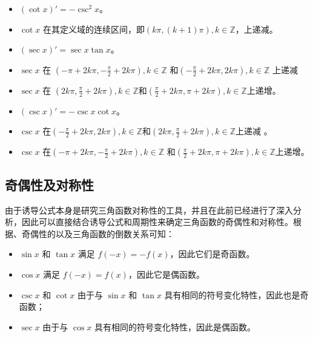 \begin{itemize}
\item $(\cot x)' = -\csc^2 x$。
\item $\cot x$ 在其定义域的连续区间，即$(k\pi, (k+1)\pi), k \in \mathbb{Z}$，上递减。
\item $(\sec x)' = \sec x \tan x$。
\item $\sec x$ 在 $\displaystyle\left(-\pi + 2k\pi, -\frac{\pi}{2} +2k\pi\right), k \in \mathbb{Z}$ 和$\displaystyle\left(-\frac{\pi}{2} + 2k\pi, 2k\pi\right), k \in \mathbb{Z}$ 上递减
\item $\sec x$ 在 $\displaystyle\left(2k\pi,\frac{\pi}{2} + 2k\pi\right), k \in \mathbb{Z}$和$\displaystyle\left(\frac{\pi}{2}  + 2k\pi, \pi+2k\pi\right), k \in \mathbb{Z}$上递增。
\item $(\csc x)' = -\csc x \cot x$。
\item $\csc x$ 在$\displaystyle\left(-\frac{\pi}{2} + 2k\pi, 2k\pi\right), k \in \mathbb{Z}$和$\displaystyle\left(2k\pi,\frac{\pi}{2} + 2k\pi\right), k \in \mathbb{Z}$上递减 。
\item $\csc x$ 在$\displaystyle\left(-\pi + 2k\pi, -\frac{\pi}{2} +2k\pi\right), k \in \mathbb{Z}$ 和$\displaystyle\left(\frac{\pi}{2}  + 2k\pi, \pi+2k\pi\right), k \in \mathbb{Z}$上递增。
\end{itemize}

\subsection{奇偶性及对称性}

由于诱导公式本身是研究三角函数对称性的工具，并且在此前已经进行了深入分析，因此可以直接结合诱导公式和周期性来确定三角函数的奇偶性和对称性。根据、奇偶性的以及三角函数的倒数关系可知：
\begin{itemize}
\item $\sin x$ 和 $\tan x$ 满足 $f(-x) = -f(x)$，因此它们是奇函数。
\item $\cos x$ 满足 $f(-x) = f(x)$，因此它是偶函数。
\item $\csc x$ 和 $\cot x$ 由于与 $\sin x$ 和 $\tan x$ 具有相同的符号变化特性，因此也是奇函数；
\item $\sec x$ 由于与 $\cos x$ 具有相同的符号变化特性，因此是偶函数。
\end{itemize}

